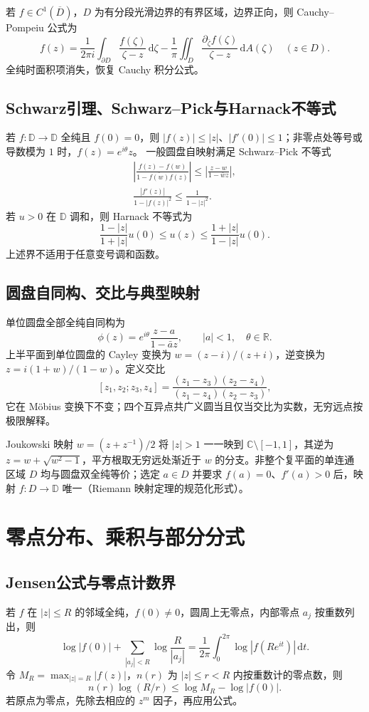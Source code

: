 \documentclass[../main.tex]{subfiles}
\begin{document}
若 $f\in C^1(\overline D)$，$D$ 为有分段光滑边界的有界区域，边界正向，则 Cauchy--Pompeiu 公式为
\[
f(z)=\frac1{2\pi i}\int_{\partial D}\frac{f(\zeta)}{\zeta-z}\,\mathrm d\zeta
-\frac1\pi\iint_D\frac{\partial_{\bar\zeta}f(\zeta)}{\zeta-z}\,\mathrm dA(\zeta)\quad(z\in D).
\]
全纯时面积项消失，恢复 Cauchy 积分公式。

\subsection{Schwarz引理、Schwarz--Pick与Harnack不等式}
若 $f:\mathbb D\to\mathbb D$ 全纯且 $f(0)=0$，则 $|f(z)|\le|z|$、$|f'(0)|\le1$；非零点处等号或导数模为 $1$ 时，$f(z)=e^{i\theta}z$。
一般圆盘自映射满足 Schwarz--Pick 不等式
\begin{gather*}
\left|\frac{f(z)-f(w)}{1-\overline{f(w)}f(z)}\right|
\le\left|\frac{z-w}{1-\bar wz}\right|,\\
\frac{|f'(z)|}{1-|f(z)|^2}\le\frac1{1-|z|^2}.
\end{gather*}
若 $u>0$ 在 $\mathbb D$ 调和，则 Harnack 不等式为
\[
\frac{1-|z|}{1+|z|}u(0)\le u(z)\le\frac{1+|z|}{1-|z|}u(0).
\]
上述界不适用于任意变号调和函数。

\subsection{圆盘自同构、交比与典型映射}
单位圆盘全部全纯自同构为
\[
\phi(z)=e^{i\theta}\frac{z-a}{1-\bar az},\qquad |a|<1,\quad\theta\in\mathbb R.
\]
上半平面到单位圆盘的 Cayley 变换为 $w=(z-i)/(z+i)$，逆变换为 $z=i(1+w)/(1-w)$。定义交比
\[
[z_1,z_2;z_3,z_4]=\frac{(z_1-z_3)(z_2-z_4)}{(z_1-z_4)(z_2-z_3)},
\]
它在 Möbius 变换下不变；四个互异点共广义圆当且仅当交比为实数，无穷远点按极限解释。

Joukowski 映射 $w=(z+z^{-1})/2$ 将 $|z|>1$ 一一映到 $\mathbb C\setminus[-1,1]$，其逆为 $z=w+\sqrt{w^2-1}$，平方根取无穷远处渐近于 $w$ 的分支。非整个复平面的单连通区域 $D$ 均与圆盘双全纯等价；选定 $a\in D$ 并要求 $f(a)=0$、$f'(a)>0$ 后，映射 $f:D\to\mathbb D$ 唯一（Riemann 映射定理的规范化形式）。

\section{零点分布、乘积与部分分式}
\subsection{Jensen公式与零点计数界}
若 $f$ 在 $|z|\le R$ 的邻域全纯，$f(0)\ne0$，圆周上无零点，内部零点 $a_j$ 按重数列出，则
\[
\log|f(0)|+\sum_{|a_j|<R}\log\frac R{|a_j|}
=\frac1{2\pi}\int_0^{2\pi}\log|f(Re^{it})|\,\mathrm dt.
\]
令 $M_R=\max_{|z|=R}|f(z)|$，$n(r)$ 为 $|z|\le r<R$ 内按重数计的零点数，则
\[
n(r)\log(R/r)\le\log M_R-\log|f(0)|.
\]
若原点为零点，先除去相应的 $z^m$ 因子，再应用公式。
\end{document}

